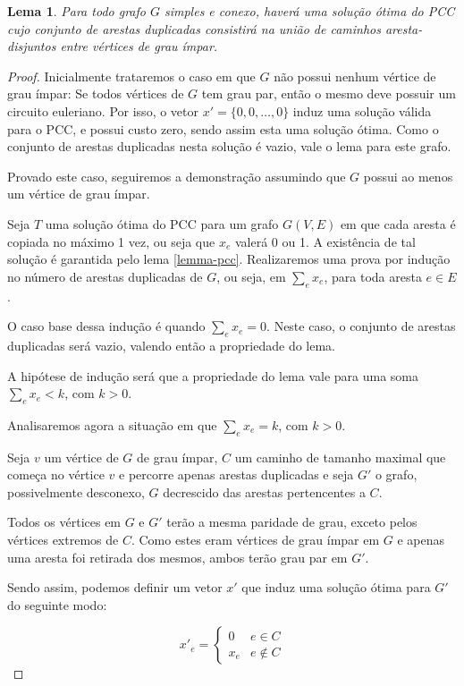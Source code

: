 \documentclass{article}
\newtheorem{lemma}{Lema}
\begin{document}
\begin{lemma}
    Para todo grafo $G$ simples e conexo, haverá uma solução ótima do PCC cujo conjunto de arestas duplicadas consistirá na união de caminhos aresta-disjuntos entre vértices de grau ímpar.
\end{lemma}

\begin{proof}

    Inicialmente trataremos o caso em que $G$ não possui nenhum vértice de grau ímpar:
    Se todos vértices de $G$ tem grau par, então o mesmo deve possuir um circuito euleriano. 
    Por isso, o vetor $x' = \{0, 0, \dots, 0\}$ induz uma solução válida para o PCC, e possui custo zero, sendo assim esta uma solução ótima.
    Como o conjunto de arestas duplicadas nesta solução é vazio, vale o lema para este grafo.

    Provado este caso, seguiremos a demonstração assumindo que $G$ possui ao menos um vértice de grau ímpar.

    Seja $T$ uma solução ótima do PCC para um grafo $G(V, E)$  em que cada aresta é copiada no máximo 1 vez, ou seja que $x_e$ valerá 0 ou 1. 
    A existência de tal solução é garantida pelo lema \ref{lemma-pcc}.
    Realizaremos uma prova por indução no número de arestas duplicadas de $G$, ou seja, em $\sum_e x_e$, para toda aresta $e \in E$. 

    O caso base dessa indução é quando $\sum_e x_e = 0$. 
    Neste caso, o conjunto de arestas duplicadas será vazio, valendo então a propriedade do lema.

    A hipótese de indução será que a propriedade do lema vale para uma soma $\sum_e x_e < k$, com $k > 0$.

    Analisaremos agora a situação em que $\sum_e x_e = k$, com $k > 0$.

    Seja $v$ um vértice de $G$ de grau ímpar,  $C$ um caminho de tamanho maximal que começa no vértice $v$ e percorre apenas arestas duplicadas e seja $G'$ o grafo, possivelmente desconexo, $G$ decrescido das arestas pertencentes a $C$.


    Todos os vértices em $G$ e $G'$ terão a mesma paridade de grau, exceto pelos vértices extremos de $C$. 
    Como estes eram vértices de grau ímpar em $G$ e apenas uma aresta foi retirada dos mesmos, ambos terão grau par em $G'$.

    Sendo assim, podemos definir um vetor $x'$ que induz uma solução ótima para $G'$ do seguinte modo:

    \[ 
        x'_e = 
        \begin{cases} 
            0 & e \in C \\
            x_e & e \notin C 
        \end{cases}
    \]



\end{proof}
\end{document}
